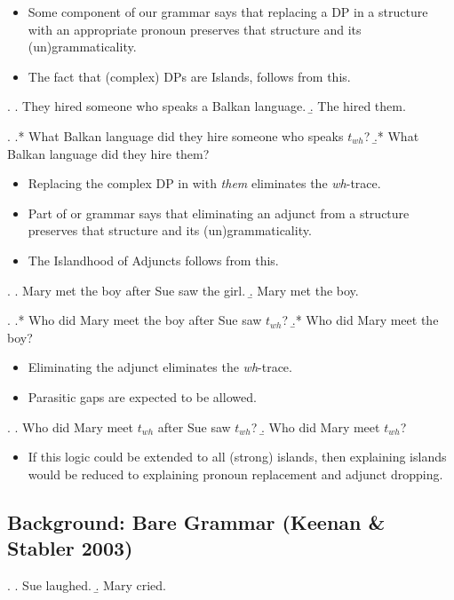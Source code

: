 \documentclass[letterpaper]{article}
\begin{document}
\begin{itemize}
  \item Some component of our grammar says that replacing a DP in a structure with an appropriate pronoun preserves that structure and its (un)grammaticality.
  \item The fact that (complex) DPs are Islands, follows from this.
\end{itemize}
\ex. 
\a. They hired someone who speaks a Balkan language.
\b. The hired them.

\ex.
\a.* What Balkan language did they hire someone who speaks $t_{wh}$?
\b.* What Balkan language did they hire them?

\begin{itemize}
  \item Replacing the complex DP in \Last[a] with \textit{them} eliminates the \textit{wh}-trace.
  \item Part of or grammar says that eliminating an adjunct from a structure preserves that structure and its (un)grammaticality.
  \item The Islandhood of Adjuncts follows from this.
\end{itemize}
\ex.
\a. Mary met the boy after Sue saw the girl.
\b. Mary met the boy.

\ex.
\a.* Who did Mary meet the boy after Sue saw $t_{wh}$?
\b.* Who did Mary meet the boy?

\begin{itemize}
  \item Eliminating the adjunct eliminates the \textit{wh}-trace.
  \item Parasitic gaps are expected to be allowed. 
\end{itemize}
\ex.
\a. Who did Mary meet $t_{wh}$ after Sue saw $t_{wh}$?
\b. Who did Mary meet $t_{wh}$?

\begin{itemize}
  \item If this logic could be extended to all (strong) islands, then explaining islands would be reduced to explaining pronoun replacement and adjunct dropping.
\end{itemize}
\subsection{Background: Bare Grammar (Keenan \& Stabler 2003)}
\ex.
\a. Sue laughed.
\b. Mary cried.
\end{document}
